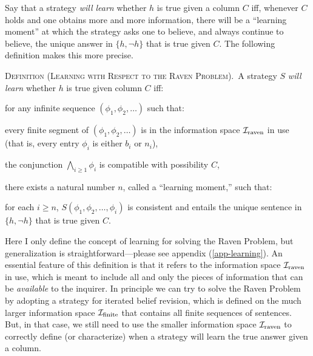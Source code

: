 Say that a strategy {\em will learn} whether $h$ is true given a column $C$ iff, whenever $C$ holds and one obtains more and more information, there will be a ``learning moment'' at which the strategy asks one to believe, and always continue to believe, the unique answer in $\{h, \neg h\}$ that is true given $C$. The following definition makes this more precise. \op

	\xm \textsc{Definition (Learning with Respect to the Raven Problem).}\, A strategy $S$ {\em will learn} whether $h$ is true given column $C$ iff: \op

		\xm for any infinite sequence $(\phi_1, \phi_2, \ldots)$ such that: \op

			\im every finite segment of $(\phi_1, \phi_2, \ldots)$ is in the information space ${\cal I}_\text{raven}$ in use (that  is, every entry $\phi_i$ is either $b_i$ or $n_i$),

			\im the conjunction $\bigwedge_{i \ge 1} \phi_i$ is compatible with possibility $C$,

		\ed there exists a natural number $n$, called a ``learning moment,'' such that: \op

			\im  for each $i\ge n$, $S(\phi_1, \phi_2, \ldots, \phi_i)$ is consistent and entails the unique sentence in $\{h, \neg h\}$ that is true given $C$.
		\ed\ed

\ed Here I only define the concept of learning for solving the Raven Problem, but generalization is straightforward---please see appendix (\autoref{app-learning}). An essential feature of this definition is that it refers to the information space ${\cal I}_\text{raven}$ in use, which is meant to include all and only the pieces of information that can be {\em available} to the inquirer. In principle we can try to solve the Raven Problem by adopting a strategy for iterated belief revision, which is defined on the much larger information space ${\cal I}_\text{finite}$ that contains all finite sequences of sentences. But, in that case, we still need to use the smaller information space ${\cal I}_\text{raven}$ to correctly define (or characterize) when a strategy will learn the true answer given a column.

